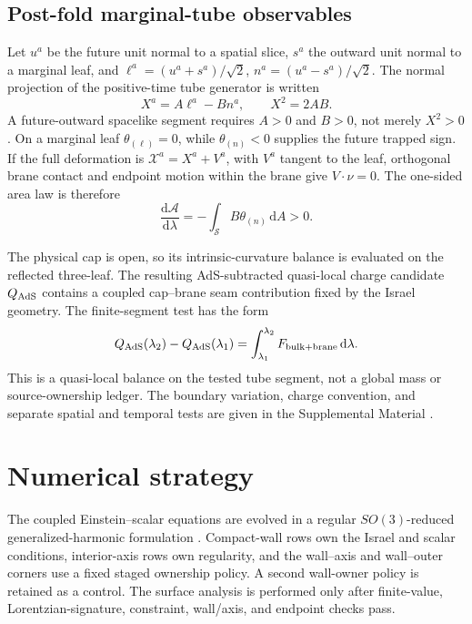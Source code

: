 \documentclass[11pt]{article}
\newcommand{\dd}{\mathrm{d}}
\begin{document}
\subsection{Post-fold marginal-tube observables}

Let $u^a$ be the future unit normal to a spatial slice, $s^a$ the outward
unit normal to a marginal leaf, and
$\ell^a=(u^a+s^a)/\sqrt2$, $n^a=(u^a-s^a)/\sqrt2$.  The normal projection of
the positive-time tube generator is written
\begin{equation}
X^a=A\ell^a-Bn^a,
\qquad X^2=2AB.
\label{eq:tube-generator}
\end{equation}
A future-outward spacelike segment requires $A>0$ and $B>0$, not merely
$X^2>0$.  On a marginal leaf $\theta_{(\ell)}=0$, while
$\theta_{(n)}<0$ supplies the future trapped sign.  If the full deformation is
$\mathcal X^a=X^a+V^a$, with $V^a$ tangent to the leaf, orthogonal brane
contact and endpoint motion within the brane give
$V\mathbin\cdot\nu=0$.  The one-sided area law is therefore
\begin{equation}
\frac{\dd\mathcal A}{\dd\lambda}
=-\int_{\mathcal S}B\theta_{(n)}\,\dd A>0.
\label{eq:tube-area-law}
\end{equation}

The physical cap is open, so its intrinsic-curvature balance is evaluated on
the reflected three-leaf.  The resulting AdS-subtracted quasi-local charge
candidate $Q_{\rm AdS}$ contains a coupled cap--brane seam contribution fixed
by the Israel geometry.  The finite-segment test has the form
\begin{equation}
Q_{\rm AdS}(\lambda_2)-Q_{\rm AdS}(\lambda_1)
=\int_{\lambda_1}^{\lambda_2}F_{\rm bulk+brane}\,\dd\lambda.
\label{eq:tube-balance}
\end{equation}
This is a quasi-local balance on the tested tube segment, not a global mass or
source-ownership ledger.  The boundary variation, charge convention, and
separate spatial and temporal tests are given in the Supplemental Material
\cite{SupplementalMaterial}.

\section{Numerical strategy}

The coupled Einstein--scalar equations are evolved in a regular
$SO(3)$-reduced generalized-harmonic formulation \cite{Pretorius2005}.  Compact-wall rows own the
Israel and scalar conditions, interior-axis rows own regularity, and the
wall--axis and wall--outer corners use a fixed staged ownership policy.  A
second wall-owner policy is retained as a control.  The surface analysis is
performed only after finite-value, Lorentzian-signature, constraint,
wall/axis, and endpoint checks pass.
\end{document}
